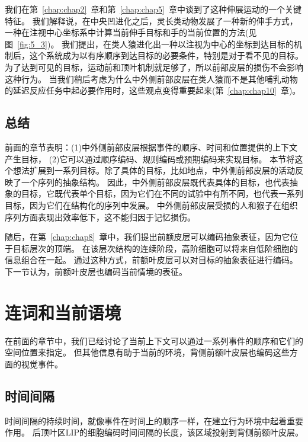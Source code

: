 我们在第~\ref{chap:chap2}~章和第~\ref{chap:chap5}~章中谈到了这种伸展运动的一个关键特征。
我们解释说，在中央凹进化之后，灵长类动物发展了一种新的伸手方式，一种在注视中心坐标系中计算当前伸手目标和手的当前位置的方法(见图~\ref{fig:5_3})。
我们提出，在类人猿进化出一种以注视为中心的坐标到达目标的机制后，这个系统成为以有序顺序到达目标的必要条件，特别是对于看不见的目标。
为了达到可见的目标，运动前和顶叶机制就足够了，所以前部皮层的损伤不会影响这种行为。
当我们稍后考虑为什么中外侧前部皮层在类人猿而不是其他哺乳动物的延迟反应任务中起必要作用时，这些观点变得重要起来(第~\ref{chap:chap10}~章)。



\subsection{总结}

前面的章节表明：(1)中外侧前部皮层根据事件的顺序、时间和位置提供的上下文产生目标，
(2)它可以通过顺序编码、规则编码或预期编码来实现目标。
本节将这个想法扩展到一系列目标。除了具体的目标，比如地点，中外侧前部皮层的活动反映了一个序列的抽象结构。
因此，中外侧前部皮层既代表具体的目标，也代表抽象的目标，它既代表单个目标，因为它们在不同的试验中有所不同，也代表一系列目标，因为它们在结构化的序列中发展。
中外侧前部皮层受损的人和猴子在组织序列方面表现出效率低下，这不能归因于记忆损伤。


随后，在第~\ref{chap:chap8}~章中，我们提出前额皮层可以编码抽象表征，因为它位于目标层次的顶端。
在该层次结构的连续阶段，高阶细胞可以将来自低阶细胞的信息组合在一起。
通过这种方式，前额叶皮层可以对目标的抽象表征进行编码。
下一节认为，前额叶皮层也编码当前情境的表征。



\section{连词和当前语境}

在前面的章节中，我们已经讨论了当前上下文可以通过一系列事件的顺序和它们的空间位置来指定。
但其他信息有助于当前的环境，背侧前额叶皮层也编码这些方面的视觉事件。


\subsection{时间间隔}

时间间隔的持续时间，就像事件在时间上的顺序一样，在建立行为环境中起着重要作用。
后顶叶区LIP的细胞编码时间间隔的长度\cite{leon2003representation}，该区域投射到背侧前额叶皮层。


